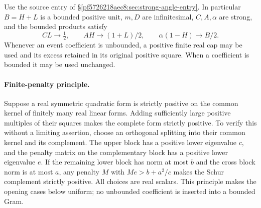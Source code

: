 \label{p7405dbf89341:sec:strong-ih-remote}
Use the source entry of \S\ref{pf5726218aec8:sec:strong-angle-entry}. In particular
$B=H+L$ is a bounded positive unit, $m,D$ are infinitesimal,
$C,A,\alpha$ are strong, and the bounded products satisfy
\[
 CL\to\tfrac12,\qquad AH\to(1+L)/2,
 \qquad\alpha(1-H)\to B/2.
\tag{SR1}
\]
Whenever an event coefficient is unbounded, a positive finite real cap
may be used and its excess retained in its original positive square.
When a coefficient is bounded it may be used unchanged.

\paragraph{Finite-penalty principle.}
Suppose a real symmetric quadratic form is strictly positive on the
common kernel of finitely many real linear forms. Adding sufficiently
large positive multiples of their squares makes the complete form
strictly positive. To verify this without a limiting assertion, choose
an orthogonal splitting into their common kernel and its complement.
The upper block has a positive lower eigenvalue $c$, and the penalty
matrix on the complementary block has a positive lower eigenvalue
$e$. If the remaining lower block has norm at most $b$ and the cross
block norm is at most $a$, any penalty $M$ with $Me>b+a^2/c$ makes the
Schur complement strictly positive. All choices are real scalars.
This principle makes the opening cases below uniform; no unbounded
coefficient is inserted into a bounded Gram.

